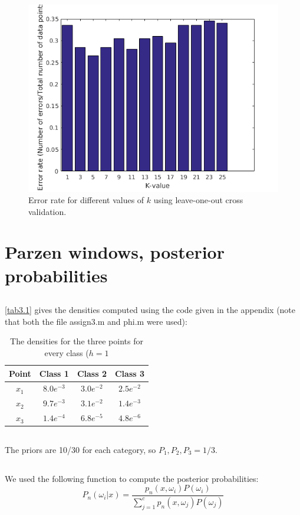 \documentclass[10pt]{article}
\begin{document}
\begin{figure}[H]
 \centering
 \includegraphics[width=.7\textwidth]{assign2_4_b.png}
 \caption{Error rate for different values of $k$ using leave-one-out cross validation.}
 \label{fig2.4_b}
\end{figure}

\section{Parzen windows, posterior probabilities}
\subsection{}
\autoref{tab3.1} gives the densities computed using the code given in the appendix (note that both the file assign3.m and phi.m were used):

\begin{table}[H]
 \centering
 \caption{The densities for the three points for every class ($h=1$}
 \begin{tabular}{c|c|c|c}
  Point & Class 1 & Class 2 & Class 3 \\
  \hline
  $x_1$ & $8.0e^{-3}$ & $3.0e^{-2}$ & $2.5e^{-2}$ \\
  $x_2$ & $9.7e^{-3}$ & $3.1e^{-2}$ & $1.4e^{-3}$ \\
  $x_3$ & $1.4e^{-4}$ & $6.8e^{-5}$ & $4.8e^{-6}$ \\
 \end{tabular}
 \label{tab3.1}
\end{table}

\subsection{}
The priors are 10/30 for each category, so ${P_1, P_2, P_3} = 1/3$.

\subsection{}
We used the following function to compute the posterior probabilities:
\begin{equation}
 P_n(\omega_i|x) = \frac{p_n(x,\omega_i)P(\omega_i)}{\sum_{j=1}^cp_n(x,\omega_j)P(\omega_j)}
\end{equation}
\end{document}
